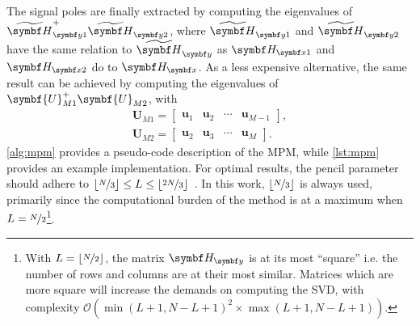 The signal poles are finally extracted by computing the eigenvalues of
$\Hytildeone^+ \Hytildetwo^{\vphantom{+}}$, where
$\Hytildeone$ and $\Hytildetwo$ have the same relation to $\Hytilde$ as
$\Hxone$ and  $\Hxtwo$ do to  $\Hx$. As a less expensive alternative, the same
result can be achieved by computing the eigenvalues of
$\symbf{U}_{M1}^+\symbf{U}_{M2}^{\vphantom{+}}$, with
\begin{subequations}
    \begin{gather}
        \symbf{U}_{M1} =
        \begin{bmatrix}
            \symbf{u}_1 & \symbf{u}_2 & \cdots & \symbf{u}_{M-1}
        \end{bmatrix},\\
        \symbf{U}_{M2} =
        \begin{bmatrix}
            \symbf{u}_2 & \symbf{u}_3 & \cdots & \symbf{u}_{M}
        \end{bmatrix}.
    \end{gather}
\end{subequations}
\cref{alg:mpm} provides a pseudo-code description of the \ac{MPM}, while
\cref{lst:mpm} provides an example \Python implementation. For optimal
results, the pencil parameter should adhere to $\lfloor \nicefrac{N}{3} \rfloor
\leq L \leq \lfloor\nicefrac{2N}{3}\rfloor$~\cite{Hua1990}. In this work,
$\lfloor\nicefrac{N}{3}\rfloor$ is always used, primarily since the computational
burden of the method is at a maximum when $L = \nicefrac{N}{2}$\footnote{
    With $L = \lfloor\nicefrac{N}{2}\rfloor$, the matrix
    $\Hy$ is at its most ``square'' i.e. the number of rows
    and columns are at their most similar. Matrices which are more
    square will increase the demands on computing the \ac{SVD}, with
    complexity $\mathcal{O}(\min(L+1,N-L+1)^2 \times \max(L+1,N-L+1))$.
}.

